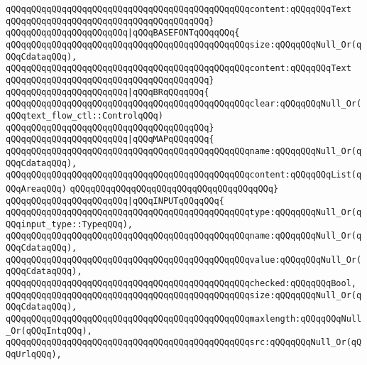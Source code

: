 \verb|qQQqqQQqqQQqqQQqqQQqqQQqqQQqqQQqqQQqqQQqqQQqqQQqcontent:qQQqqQQqText|\newline
\verb|qQQqqQQqqQQqqQQqqQQqqQQqqQQqqQQqqQQqqQQq}|\newline
\verb|qQQqqQQqqQQqqQQqqQQqqQQq|\verb#|qQQqBASEFONTqQQqqQQq{#\newline
\verb|qQQqqQQqqQQqqQQqqQQqqQQqqQQqqQQqqQQqqQQqqQQqqQQqsize:qQQqqQQqNull_Or(qQQqCdataqQQq),|\newline
\verb|qQQqqQQqqQQqqQQqqQQqqQQqqQQqqQQqqQQqqQQqqQQqqQQqcontent:qQQqqQQqText|\newline
\verb|qQQqqQQqqQQqqQQqqQQqqQQqqQQqqQQqqQQqqQQq}|\newline
\verb|qQQqqQQqqQQqqQQqqQQqqQQq|\verb#|qQQqBRqQQqqQQq{#\newline
\verb|qQQqqQQqqQQqqQQqqQQqqQQqqQQqqQQqqQQqqQQqqQQqqQQqclear:qQQqqQQqNull_Or(qQQqtext_flow_ctl::ControlqQQq)|\newline
\verb|qQQqqQQqqQQqqQQqqQQqqQQqqQQqqQQqqQQqqQQq}|\newline
\verb|qQQqqQQqqQQqqQQqqQQqqQQq|\verb#|qQQqMAPqQQqqQQq{#\newline
\verb|qQQqqQQqqQQqqQQqqQQqqQQqqQQqqQQqqQQqqQQqqQQqqQQqname:qQQqqQQqNull_Or(qQQqCdataqQQq),|\newline
\verb|qQQqqQQqqQQqqQQqqQQqqQQqqQQqqQQqqQQqqQQqqQQqqQQqcontent:qQQqqQQqList(qQQqAreaqQQq)|\newline
\verb|qQQqqQQqqQQqqQQqqQQqqQQqqQQqqQQqqQQqqQQq}|\newline
\verb|qQQqqQQqqQQqqQQqqQQqqQQq|\verb#|qQQqINPUTqQQqqQQq{#\newline
\verb|qQQqqQQqqQQqqQQqqQQqqQQqqQQqqQQqqQQqqQQqqQQqqQQqtype:qQQqqQQqNull_Or(qQQqinput_type::TypeqQQq),|\newline
\verb|qQQqqQQqqQQqqQQqqQQqqQQqqQQqqQQqqQQqqQQqqQQqqQQqname:qQQqqQQqNull_Or(qQQqCdataqQQq),|\newline
\verb|qQQqqQQqqQQqqQQqqQQqqQQqqQQqqQQqqQQqqQQqqQQqqQQqvalue:qQQqqQQqNull_Or(qQQqCdataqQQq),|\newline
\verb|qQQqqQQqqQQqqQQqqQQqqQQqqQQqqQQqqQQqqQQqqQQqqQQqchecked:qQQqqQQqBool,|\newline
\verb|qQQqqQQqqQQqqQQqqQQqqQQqqQQqqQQqqQQqqQQqqQQqqQQqsize:qQQqqQQqNull_Or(qQQqCdataqQQq),|\newline
\verb|qQQqqQQqqQQqqQQqqQQqqQQqqQQqqQQqqQQqqQQqqQQqqQQqmaxlength:qQQqqQQqNull_Or(qQQqIntqQQq),|\newline
\verb|qQQqqQQqqQQqqQQqqQQqqQQqqQQqqQQqqQQqqQQqqQQqqQQqsrc:qQQqqQQqNull_Or(qQQqUrlqQQq),|\newline
